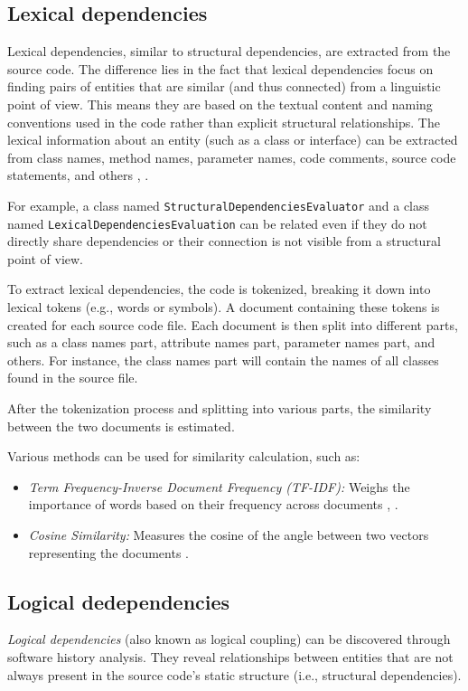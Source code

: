 \subsection{Lexical dependencies}

\hspace{4em}Lexical dependencies, similar to structural dependencies, are extracted from the source code. The difference lies in the fact that lexical dependencies focus on finding pairs of entities that are similar (and thus connected) from a linguistic point of view. This means they are based on the textual content and naming conventions used in the code rather than explicit structural relationships. The lexical information about an entity (such as a class or interface) can be extracted from class names, method names, parameter names, code comments, source code statements, and others \cite{lexical-dep}, \cite{lexical-dep-Prajapati}.

For example, a class named \texttt{StructuralDependenciesEvaluator} and a class named \texttt{LexicalDependenciesEvaluation} can be related even if they do not directly share dependencies or their connection is not visible from a structural point of view.

To extract lexical dependencies, the code is tokenized, breaking it down into lexical tokens (e.g., words or symbols). A document containing these tokens is created for each source code file. Each document is then split into different parts, such as a class names part, attribute names part, parameter names part, and others. For instance, the class names part will contain the names of all classes found in the source file.

After the tokenization process and splitting into various parts, the similarity between the two documents is estimated. 

Various methods can be used for similarity calculation, such as:
\begin{itemize}
    \item \textit{Term Frequency-Inverse Document Frequency (TF-IDF):} Weighs the importance of words based on their frequency across documents \cite{lexical-dep}, \cite{corazza2}.
    \item \textit{Cosine Similarity:} Measures the cosine of the angle between two vectors representing the documents \cite{lexical-dep-Prajapati}.
\end{itemize}



\subsection{Logical dedependencies}
\hspace{4em} \textit{Logical dependencies} (also known as logical coupling) can be discovered through software history analysis. They reveal relationships between entities that are not always present in the source code's static structure (i.e., structural dependencies).

